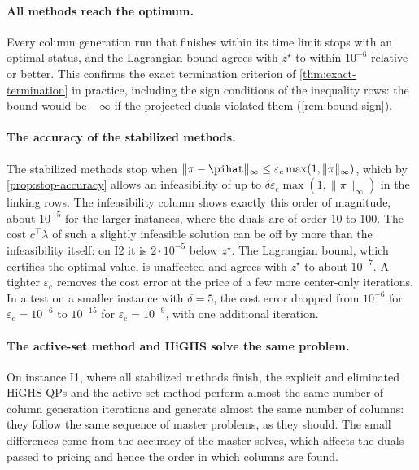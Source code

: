\paragraph{All methods reach the optimum.} Every column generation run that finishes within
its time limit stops with an optimal status, and the Lagrangian bound agrees with $z^\star$ to
within $10^{-6}$ relative or better. This confirms the exact termination criterion of
\cref{thm:exact-termination} in practice, including the sign conditions of the inequality
rows: the bound would be $-\infty$ if the projected duals violated them
(\cref{rem:bound-sign}).

\paragraph{The accuracy of the stabilized methods.} The stabilized methods stop when
$\lVert\pi-\pihat\rVert_\infty\le\varepsilon_{\mathrm{c}}\max(1,\lVert\pi\rVert_\infty)$, which by
\cref{prop:stop-accuracy} allows an infeasibility of up to $\delta\varepsilon_{\mathrm{c}}\max(1,\lVert\pi\rVert_\infty)$
in the linking rows. The infeasibility column shows exactly this order of magnitude, about
$10^{-5}$ for the larger instances, where the duals are of order $10$ to $100$. The cost
$c^\top\lambda$ of such a slightly infeasible solution can be off by more than the
infeasibility itself: on I2 it is $2\cdot10^{-5}$ below $z^\star$. The Lagrangian bound, which
certifies the optimal value, is unaffected and agrees with $z^\star$ to about $10^{-7}$. A
tighter $\varepsilon_{\mathrm{c}}$ removes the cost error at the price of a few more center-only iterations. In a
test on a smaller instance with $\delta = 5$, the cost error dropped from $10^{-6}$ for
$\varepsilon_{\mathrm{c}} = 10^{-6}$ to $10^{-15}$ for $\varepsilon_{\mathrm{c}} = 10^{-9}$, with one additional iteration.

\paragraph{The active-set method and HiGHS solve the same problem.} On instance I1, where
all stabilized methods finish, the explicit and eliminated HiGHS QPs and the active-set method
perform almost the same number of column generation iterations and generate almost the same
number of columns: they follow the same sequence of master problems, as they should. The small
differences come from the accuracy of the master solves, which affects the duals passed to
pricing and hence the order in which columns are found.


